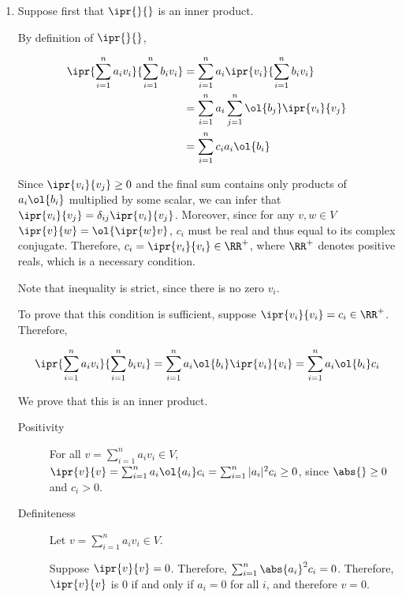 \documentclass[11pt]{scrartcl}
\begin{document}
\begin{enumerate}[label=\alph*)]
\item

  Suppose first that $\ipr{\*}{\*}$ is an inner product.

  By definition of $\ipr{\*}{\*}$,

  \begin{align}
    \ipr{\sum_{i=1}^na_iv_i}{\sum_{i=1}^nb_iv_i} & = \sum_{i=1}^na_i\ipr{v_i}{\sum_{i=1}^nb_iv_i} \\
                                                 & =\sum_{i=1}^na_i\sum_{j=1}^n\ol{b_j}\ipr{v_i}{v_j}                                              \\
                                                 & = \sum_{i=1}^nc_ia_i\ol{b_i}
  \end{align}

  Since $\ipr{v_i}{v_j}\geq 0$ and the final sum contains only
  products of $a_i\ol{b_i}$ multiplied by some scalar, we can infer
  that $\ipr{v_i}{v_j} = \delta_{ij}\ipr{v_i}{v_j}$. Moreover, since
  for any $v, w\in V$ $\ipr{v}{w} = \ol{\ipr{w}v}$, $c_i$ must be real
  and thus equal to its complex conjugate. Therefore,
  $c_i = \ipr{v_i}{v_i} \in \RR^{+}$, where $\RR^{+}$ denotes positive
  reals, which is a necessary condition.

  Note that inequality is strict, since there is no zero $v_i$.

  To prove that this condition is sufficient, suppose
  $\ipr{v_i}{v_i}=c_i \in \RR^{+}$. Therefore,

  \begin{equation*}
    \ipr{\sum_{i=1}^na_iv_i}{\sum_{i=1}^nb_iv_i} = \sum_{i=1}^na_i\ol{b_i}\ipr{v_i}{v_i} = \sum_{i=1}^na_i\ol{b_i}c_{i}
  \end{equation*}

  We prove that this is an inner product.

\begin{description}

\item[Positivity]\hfill

  For all $v = \sum_{i=1}^na_iv_i\in V$, $\ipr{v}{v} = \sum_{i=1}^na_i\ol{a_i}c_i = \sum_{i=1}^n|a_i|^2c_i \geq 0$, since $\abs{\*}\geq 0$ and $c_i >0$.
\item[Definiteness] \hfill

  Let $v = \sum_{i=1}^na_iv_i\in V$.

  Suppose $\ipr{v}{v} = 0$. Therefore, $\sum_{i=1}^n \abs{a_i}^2c_{i} = 0$. Therefore, $\ipr{v}{v}$ is $0$ if and only if $a_i = 0$ for all $i$, and therefore $v = 0$.
  

\end{description}
\end{enumerate}
\end{document}
